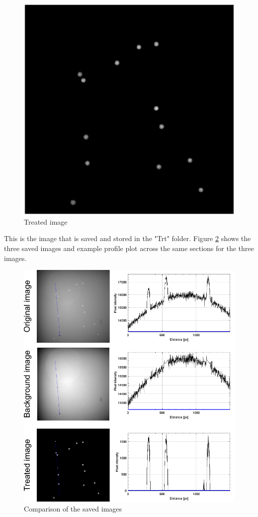 \documentclass[a4paper]{article}
\begin{document}
\begin{enumerate}
    \begin{figure}[H]
        \center
        \label{fig10}
        \includegraphics[scale=0.75]{treated.png}
        \caption{Treated image}
    \end{figure}

    This is the image that is saved and stored in the "Trt" folder. Figure \ref{fig11} shows the three saved images and example profile plot across the same sections for the three images.

    \begin{figure}[H]
            \center
            \includegraphics[scale=0.75]{fig11.pdf}
            \caption{Comparison of the saved images}
            \label{fig11}
    \end{figure}


\end{enumerate}
\end{document}
